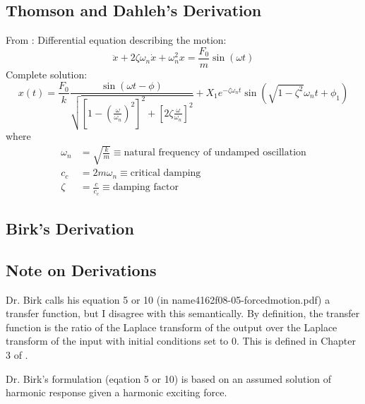 \documentclass[10pt,letterpaper]{article}
\begin{document}
\subsection{Thomson and Dahleh's Derivation}
From \citet{thomson98.1}:
Differential equation describing the motion:
\begin{equation}
	\ddot{x} + 2\zeta\omega_n \dot{x} + \omega_n^2 x = \frac{F_0}{m}\sin(\omega t)
\end{equation}
Complete solution:
\begin{equation}
	x(t) = \frac{F_0}{k}\frac{\sin(\omega t - \phi)}{\sqrt{\left[1-\left(\frac{\omega}{\omega_n}\right)^2 \right]^2 + \left[2\zeta\frac{\omega}{\omega_n} \right]^2}} + X_1 e^{-\zeta\omega_n t}\sin(\sqrt{1-\zeta^2}\omega_n t + \phi_1)
\end{equation}
where 
\begin{align}
	\omega_n &= \sqrt{\frac{k}{m}} \equiv \text{natural frequency of undamped oscillation} \\
	c_c &= 2m\omega_n \equiv \text{critical damping} \\
	\zeta &= \frac{c}{c_c} \equiv \text{damping factor}
\end{align}

\subsection{Birk's Derivation}

\subsection{Note on Derivations}
Dr. Birk calls his equation 5 or 10 (in name4162f08-05-forcedmotion.pdf) a transfer function, but I disagree with this semantically.
By definition, the transfer function is the ratio of the Laplace transform of the output over the Laplace transform of the input with initial conditions set to 0.
This is defined in Chapter 3 of \citet{ogata01.1}.


Dr. Birk's formulation (eqation 5 or 10) is based on an assumed solution of harmonic response given a harmonic exciting force.
\end{document}
